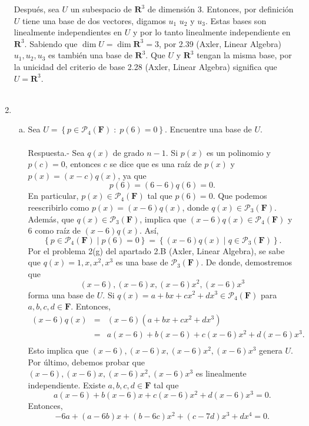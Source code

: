 \begin{enumerate}[\bfseries 1.]
	Después, sea $U$ un subespacio de $\textbf{R}^3$ de dimensión $3$. Entonces, por definición $U$ tiene una base de dos vectores, digamos $u_1$ $u_2$ y $u_3$. Estas bases son linealmente independientes en $U$ y por lo tanto linealmente independiente en $\textbf{R}^3$. Sabiendo que $\dim U = \dim \textbf{R}^3=3$,  por 2.39 (Axler, Linear Algebra) $u_1,u_2,u_3$ es también una base de $\textbf{R}^3$. Que $U$ y $\textbf{R}^3$ tengan la misma base, por la unicidad del criterio de base 2.28 (Axler, Linear Algebra) significa que $U=\textbf{R}^3$.\\\\


    \item 
	\begin{enumerate}[(a)]

	    \item Sea $U=\left\{p\in \mathcal{P}_4(\textbf{F})\; : \; p(6)=0\right\}.$ Encuentre una base de $U$.\\\\
		Respuesta.-\; Sea $q(x)$ de grado $n-1$. Si $p(x)$ es un polinomio y $p(c)=0$, entonces $c$ se dice que es una raíz de $p(x)$ y $p(x)=(x-c)q(x)$, ya que 
		$$p(6)=(6-6)q(6)=0.$$
		En particular, $p(x)\in \mathcal{P}_4(\textbf{F})$ tal que $p(6)=0$. Que podemos reescribirlo como $p(x)=(x-6)q(x)$, donde $q(x)\in \mathcal{P}_3(\textbf{F})$. Además, que $q(x)\in \mathcal{P}_3(\textbf{F})$, implica que $(x-6)q(x)\in \mathcal{P}_4(\textbf{F})$ y $6$ como raíz de $(x-6)q(x)$. Así,
		$$\left\{p\in \mathcal{P}_4(\textbf{F})\; |\; p(6)=0\right\}=\left\{(x-6)q(x)\; |\; q\in\mathcal{P}_3(\textbf{F})\right\}.$$
		Por el problema 2(g) del apartado 2.B (Axler, Linear Algebra), se sabe que $q(x)=1,x,x^2,x^3$ es una base de $\mathcal{P}_3(\textbf{F})$. De donde, demostremos que 
		$$(x-6),(x-6)x,(x-6)x^2,(x-6)x^3$$
		forma una base de $U$. Si $q(x)=a+bx+cx^2+dx^3\in \mathcal{P}_4(\textbf{F})$ para $a,b,c,d\in \textbf{F}$. Entonces,
		$$
		\begin{array}{rcl}
		    (x-6)q(x)&=&(x-6)(a+bx+cx^2+dx^3)\\
			     &=&a(x-6)+b(x-6)+c(x-6)x^2+d(x-6)x^3.\\
		\end{array}
		$$
		Esto implica que $(x-6),(x-6)x,(x-6)x^2,(x-6)x^3$ genera $U$. Por último, debemos probar que $(x-6),(x-6)x,(x-6)x^2,(x-6)x^3$ es linealmente independiente. Existe $a,b,c,d\in \textbf{F}$ tal que
		$$a(x-6)+b(x-6)x+c(x-6)x^2+d(x-6)x^3=0.$$
		Entonces,
		$$-6a+(a-6b)x+(b-6c)x^2+(c-7d)x^3+dx^4=0.$$

\end{enumerate}
\end{enumerate}
